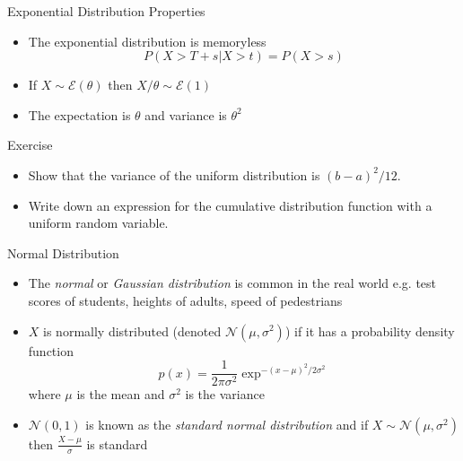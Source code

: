 \documentclass{beamer}
\begin{document}
\begin{frame}{Exponential Distribution Properties}
\begin{itemize} 
 \item The exponential distribution is memoryless 
 \begin{displaymath}
  P(X > T + s | X > t) = P(X > s)
 \end{displaymath}
\item If $X \sim \mathcal{E}(\theta)$ then $X/\theta \sim \mathcal{E}(1)$
\item The expectation is $\theta$ and variance is $\theta^2$ 
\end{itemize}
\end{frame}


\begin{frame}{Exercise} 
\begin{itemize} 
 \item Show that the variance of the uniform distribution is $(b-a)^2/12$. 
 \item Write down an expression for the cumulative distribution function with a uniform random variable.
\end{itemize}
\end{frame}



\begin{frame}{Normal Distribution}  
\begin{itemize} 
 \item The \emph{normal} or \emph{Gaussian distribution} is common in the real world e.g. test scores of students, heights of adults, speed of pedestrians 
\item $X$ is normally distributed (denoted $\mathcal{N}(\mu, \sigma^2)$) if it has a probability density function 
\begin{displaymath} 
 p(x) = \frac{1}{2\pi\sigma^2}\exp^{-(x-\mu)^2/2\sigma^2} 
\end{displaymath}
where $\mu$ is the mean and $\sigma^2$ is the variance
\item $\mathcal{N}(0, 1)$ is known as the \emph{standard normal distribution} and if $X \sim \mathcal{N}(\mu, \sigma^2)$ then $\frac{X-\mu}{\sigma}$ is standard 
\end{itemize}
\end{frame}
\end{document}
